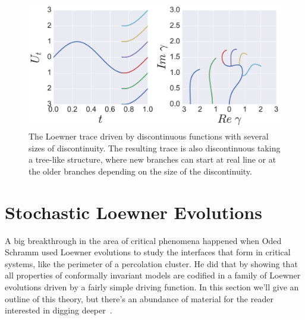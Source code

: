 \begin{figure}
\begin{center}
    \includegraphics[width=\textwidth]{chapters/ch4-sle/figs/discle}
\end{center}
\caption{The Loewner trace driven by discontinuous functions with several sizes
    of discontinuity. The resulting trace is also discontinuous taking a
    tree-like structure, where new branches can start at real line or at the
    older branches depending on the size of the discontinuity.}
\label{fig:discle}
\end{figure}


\section{Stochastic Loewner Evolutions}
\label{sec:sle}

A big breakthrough in the area of critical phenomena happened when Oded Schramm
used Loewner evolutions to study the interfaces that form in critical systems,
like the perimeter of a percolation cluster. He did that by showing that all
properties of conformally invariant models are codified in a family of Loewner
evolutions driven by a fairly simple driving function. In this section we'll
give an outline of this theory, but there's an abundance of material for the
reader interested in digging deeper~\cite{Cardy2005, Kager2004, Henkel2012}.

